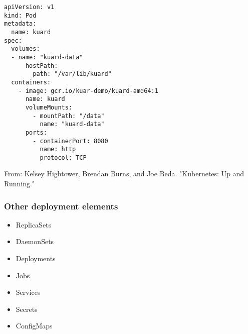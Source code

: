 \documentclass[10pt]{beamer}
\begin{document}
\begin{frame}[fragile]

\begin{verbatim}
apiVersion: v1
kind: Pod
metadata:
  name: kuard
spec:
  volumes:
  - name: "kuard-data"
      hostPath:
        path: "/var/lib/kuard"
  containers:
    - image: gcr.io/kuar-demo/kuard-amd64:1
      name: kuard
      volumeMounts:
        - mountPath: "/data"
          name: "kuard-data"
      ports:
        - containerPort: 8080
          name: http
          protocol: TCP
\end{verbatim}

\tiny{From: Kelsey Hightower, Brendan Burns, and Joe Beda. "Kubernetes: Up and Running."}


\end{frame}

\begin{frame}
  \frametitle{Other deployment elements}
  
  \begin{itemize}
    \item ReplicaSets
    \item DaemonSets
    \item Deployments
    \item Jobs
    \item Services
    \item Secrets
    \item ConfigMaps
  \end{itemize}
\end{frame}
\end{document}
